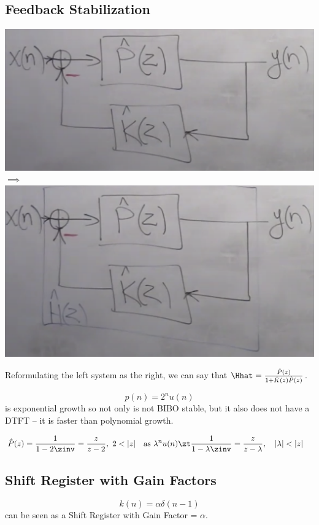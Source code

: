 \subsection{Feedback Stabilization}
\includegraphics[scale=0.2]{lectures/wk12/img/system.png}
$\implies$
\includegraphics[scale=0.17]{lectures/wk12/img/system2.png}

Reformulating the left system as the right, we can say that $\Hhat=\frac{\hat P(z)}{1+\hat K(z)\hat P(z)}$.

\[
    p(n)=2^n u(n)
\]
is exponential growth so not only is not BIBO stable, but it also does not have a DTFT -- it is faster than polynomial growth.

\begin{align*}
    \hat P(z) 
    &=
    \frac1{1-2\zinv}=\frac{z}{z-2},\ 2<|z|
    &&\text{as }\lambda^n u(n)\zt \frac1{1-\lambda\zinv}=\frac{z}{z-\lambda},\quad|\lambda|<|z|
\end{align*}

\subsection{Shift Register with Gain Factors}
\[
    k(n) = \alpha\delta(n-1)
\]
can be seen as a Shift Register with Gain Factor = $\alpha$.

